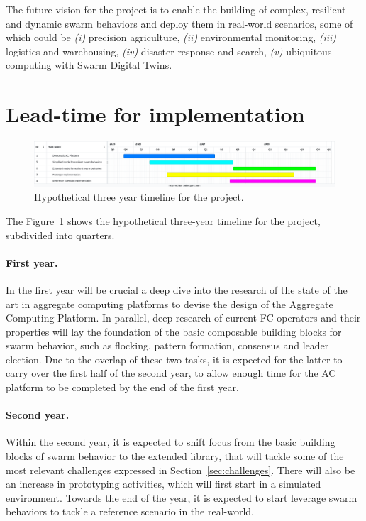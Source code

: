 \documentclass[12pt]{article}
\begin{document}
The future vision for the project is to enable the building of complex, resilient and dynamic swarm behaviors and deploy them in real-world scenarios, some of which could be \textit{(i)} precision agriculture,
\textit{(ii)} environmental monitoring, \textit{(iii)} logistics and warehousing, \textit{(iv)} disaster response and search, 
\textit{(v)} ubiquitous computing with Swarm Digital Twins.

\section{Lead-time for implementation}
\begin{figure}
	\includegraphics[width=\linewidth]{figures/timeline.png}
	\caption{Hypothetical three year timeline for the project.}
	\label{fig:timeline}
\end{figure}

The Figure~\ref{fig:timeline} shows the hypothetical three-year timeline for the project, subdivided into quarters.

\paragraph{First year.} In the first year will be crucial a deep dive into the research of the state of the art in aggregate computing platforms to devise the design of the Aggregate Computing Platform.
In parallel, deep research of current FC operators and their properties will lay the foundation of the basic composable building blocks for swarm behavior, such as flocking, pattern formation, consensus and leader election.
Due to the overlap of these two tasks, it is expected for the latter to carry over the first half of the second year, to allow enough time for the AC platform to be completed by the end of the first year.

\paragraph{Second year.} Within the second year, it is expected to shift focus from the basic building blocks of swarm behavior to the extended library, that will tackle some of the most relevant challenges expressed in Section~\ref{sec:challenges}.
There will also be an increase in prototyping activities, which will first start in a simulated environment.
Towards the end of the year, it is expected to start leverage swarm behaviors to tackle a reference scenario in the real-world.
\end{document}
